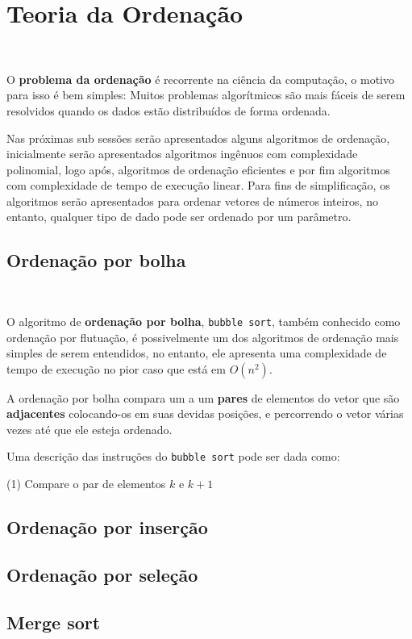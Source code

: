 \section{Teoria da Ordenação}
\

O \textbf{problema da ordenação} é recorrente na ciência da computação, o motivo para isso é bem simples: Muitos problemas algorítmicos são mais fáceis de serem resolvidos quando os dados estão distribuídos de forma ordenada.

Nas próximas sub sessões serão apresentados alguns algoritmos de ordenação, inicialmente serão apresentados algoritmos ingênuos com complexidade polinomial, logo após, algoritmos de ordenação eficientes e por fim algoritmos com complexidade de tempo de execução linear. Para fins de simplificação, os algoritmos serão apresentados para ordenar vetores de números inteiros, no entanto, qualquer tipo de dado pode ser ordenado por um parâmetro. 

\subsection{Ordenação por bolha}
\

O algoritmo de \textbf{ordenação por bolha}, \texttt{bubble sort}, também conhecido como ordenação por flutuação, é possivelmente um dos algoritmos de ordenação mais simples de serem entendidos, no entanto, ele apresenta uma complexidade de tempo de execução no pior caso que está em $O(n^2)$.

A ordenação por bolha compara um a um \textbf{pares} de elementos do vetor que são \textbf{adjacentes} colocando-os em suas devidas posições, e percorrendo o vetor várias vezes até que ele esteja ordenado.

Uma descrição das instruções do \texttt{bubble sort} pode ser dada como:

(1) Compare o par de elementos $k$ e $k+1$

\subsection{Ordenação por inserção}

\subsection{Ordenação por seleção}

\subsection{Merge sort}

